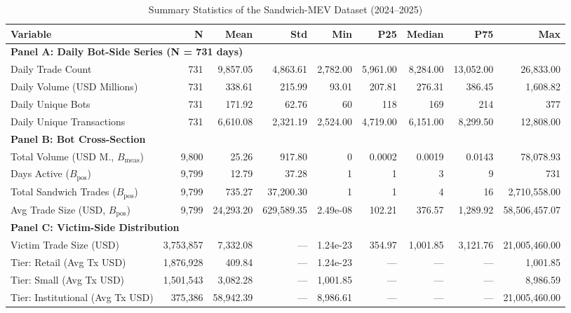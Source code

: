 \begin{table}[htbp]
\centering
\caption{Summary Statistics of the Sandwich-MEV Dataset (2024--2025)}
\label{tab:descriptives}
\tiny
\setlength{\tabcolsep}{2.5pt}
\begin{tabular}{lrrrrrrrr}
\toprule
Variable & N & Mean & Std & Min & P25 & Median & P75 & Max \\
\midrule
\multicolumn{9}{l}{\textbf{Panel A: Daily Bot-Side Series (N = 731 days)}} \\
\midrule
Daily Trade Count & 731 & 9,857.05 & 4,863.61 & 2,782.00 & 5,961.00 & 8,284.00 & 13,052.00 & 26,833.00 \\
Daily Volume (USD Millions) & 731 & 338.61 & 215.99 & 93.01 & 207.81 & 276.31 & 386.45 & 1,608.82 \\
Daily Unique Bots & 731 & 171.92 & 62.76 & 60 & 118 & 169 & 214 & 377 \\
Daily Unique Transactions & 731 & 6,610.08 & 2,321.19 & 2,524.00 & 4,719.00 & 6,151.00 & 8,299.50 & 12,808.00 \\
\midrule
\multicolumn{9}{l}{\textbf{Panel B: Bot Cross-Section}} \\
\midrule
Total Volume (USD M., $B_{\text{meas}}$) & 9,800 & 25.26 & 917.80 & 0 & 0.0002 & 0.0019 & 0.0143 & 78,078.93 \\
Days Active ($B_{\text{pos}}$) & 9,799 & 12.79 & 37.28 & 1 & 1 & 3 & 9 & 731 \\
Total Sandwich Trades ($B_{\text{pos}}$) & 9,799 & 735.27 & 37,200.30 & 1 & 1 & 4 & 16 & 2,710,558.00 \\
Avg Trade Size (USD, $B_{\text{pos}}$) & 9,799 & 24,293.20 & 629,589.35 & 2.49e-08 & 102.21 & 376.57 & 1,289.92 & 58,506,457.07 \\
\midrule
\multicolumn{9}{l}{\textbf{Panel C: Victim-Side Distribution}} \\
\midrule
Victim Trade Size (USD) & 3,753,857 & 7,332.08 & --- & 1.24e-23 & 354.97 & 1,001.85 & 3,121.76 & 21,005,460.00 \\
Tier: Retail (Avg Tx USD) & 1,876,928 & 409.84 & --- & 1.24e-23 & --- & --- & --- & 1,001.85 \\
Tier: Small (Avg Tx USD) & 1,501,543 & 3,082.28 & --- & 1,001.85 & --- & --- & --- & 8,986.59 \\
Tier: Institutional (Avg Tx USD) & 375,386 & 58,942.39 & --- & 8,986.61 & --- & --- & --- & 21,005,460.00 \\
\bottomrule
\end{tabular}
\normalsize
\vspace{0.2cm}

\end{table}
